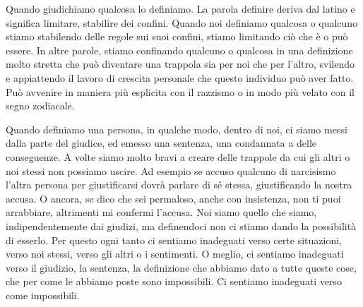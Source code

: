 \documentclass[12pt]{book} %
\begin{document}
Quando giudichiamo qualcosa lo definiamo. La parola definire deriva dal latino e significa limitare, stabilire dei
confini. Quando noi definiamo qualcosa o qualcuno stiamo stabilendo delle regole sui suoi confini, stiamo limitando ciò
che è o può essere. In altre parole, stiamo confinando qualcuno o qualcosa in una definizione molto stretta che può diventare una 
trappola sia per noi che per l'altro, svilendo e appiattendo il lavoro di crescita personale che questo individuo può aver fatto.
Può avvenire in maniera più esplicita con il razzismo o in modo più velato con il segno zodiacale.

Quando definiamo una persona, in qualche modo, dentro di noi, ci siamo messi dalla parte del giudice, ed emesso
una sentenza, una condannata a delle conseguenze. 
A volte siamo molto bravi a creare delle trappole da cui gli altri o noi stessi non possiamo uscire.
Ad esempio se accuso qualcuno di narcisismo l'altra persona per giustificarsi dovrà parlare di sé stessa, giustificando la nostra accusa. O ancora, se dico che sei permaloso, anche con insistenza, non ti puoi arrabbiare, altrimenti mi confermi l'accusa.
Noi siamo quello che siamo,
indipendentemente dai giudizi, ma definendoci non ci stiamo dando la possibilità di esserlo. Per questo ogni tanto ci
sentiamo inadeguati verso certe situazioni, verso noi stessi, verso gli altri o i sentimenti. O meglio, ci sentiamo
inadeguati verso il giudizio, la sentenza, la definizione che abbiamo dato a tutte queste cose, che per come le abbiamo
poste sono impossibili. Ci sentiamo inadeguati verso come impossibili.
\end{document}
